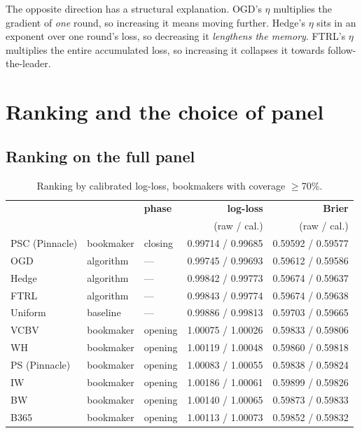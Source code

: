 \documentclass[12pt,a4paper,oneside]{report}
\renewcommand{\_}{\oldunderscore\allowbreak}
\theoremstyle{definition}
\theoremstyle{plain}
\theoremstyle{remark}
\begin{document}
The opposite direction has a structural explanation. OGD's $\eta$ multiplies the gradient of
\emph{one} round, so increasing it means moving further. Hedge's $\eta$ sits in an exponent over
one round's loss, so decreasing it \emph{lengthens the memory}. FTRL's $\eta$ multiplies the
entire accumulated loss, so increasing it collapses it towards follow-the-leader.

\section{Ranking and the choice of panel}

\subsection{Ranking on the full panel}

\begin{table}[H]
\centering
\small
\begin{tabular}{@{}lllrr@{}}
\toprule
& & \textbf{phase} & \textbf{log-loss} & \textbf{Brier} \\
& & & (raw / cal.) & (raw / cal.) \\
\midrule
PSC (Pinnacle) & bookmaker & closing & 0.99714 / 0.99685 & 0.59592 / 0.59577 \\
OGD            & algorithm & ---     & 0.99745 / 0.99693 & 0.59612 / 0.59586 \\
Hedge          & algorithm & ---     & 0.99842 / 0.99773 & 0.59674 / 0.59637 \\
FTRL           & algorithm & ---     & 0.99843 / 0.99774 & 0.59674 / 0.59638 \\
Uniform        & baseline  & ---     & 0.99886 / 0.99813 & 0.59703 / 0.59665 \\
VC\_BV         & bookmaker & opening & 1.00075 / 1.00026 & 0.59833 / 0.59806 \\
WH             & bookmaker & opening & 1.00119 / 1.00048 & 0.59860 / 0.59818 \\
PS (Pinnacle)  & bookmaker & opening & 1.00083 / 1.00055 & 0.59838 / 0.59824 \\
IW             & bookmaker & opening & 1.00186 / 1.00061 & 0.59899 / 0.59826 \\
BW             & bookmaker & opening & 1.00140 / 1.00065 & 0.59873 / 0.59833 \\
B365           & bookmaker & opening & 1.00113 / 1.00073 & 0.59852 / 0.59832 \\
\bottomrule
\end{tabular}
\caption{Ranking by calibrated log-loss, bookmakers with coverage $\geq$70\%.}
\label{tab:ranking}
\end{table}
\end{document}
